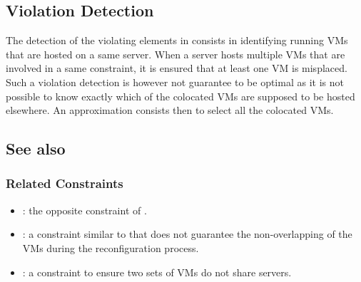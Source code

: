 {\subsection{Violation Detection}

The detection of the violating elements in  consists in identifying running VMs that are hosted on a same server. When a server hosts multiple VMs that are involved in a same  constraint, it is ensured that at least one VM is misplaced. Such a violation detection is however not guarantee to be optimal as it is not possible to know exactly which of the colocated VMs are supposed to be hosted elsewhere. An approximation consists then to select all the colocated VMs.
}

\subsection{See also}

\subsubsection{Related Constraints}
\begin{itemize}
\item {}: the opposite constraint of .
\item {}: a constraint similar to  that does not guarantee the non-overlapping of the VMs during the reconfiguration process.
\item {}: a constraint to ensure two sets of VMs do not share servers.

\end{itemize}

